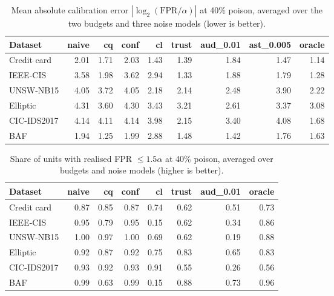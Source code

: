 \begin{table}[t]
\caption{Mean absolute calibration error $|\log_2(\mathrm{FPR}/\alpha)|$ at 40\% poison, averaged over the two budgets and three noise models (lower is better).}\label{tab:acal}
\centering\small
\begin{tabular}{lrrrrrrrr}
\toprule
Dataset & naive & cq & conf & cl & trust & aud\_0.01 & ast\_0.005 & oracle \\
\midrule
Credit card & 2.01 & 1.71 & 2.03 & 1.43 & 1.39 & 1.84 & 1.47 & 1.14 \\
IEEE-CIS & 3.58 & 1.98 & 3.62 & 2.94 & 1.33 & 1.88 & 1.79 & 1.28 \\
UNSW-NB15 & 4.05 & 3.72 & 4.05 & 2.18 & 2.14 & 2.48 & 3.90 & 2.22 \\
Elliptic & 4.31 & 3.60 & 4.30 & 3.43 & 3.21 & 2.61 & 3.37 & 3.08 \\
CIC-IDS2017 & 4.14 & 4.11 & 4.14 & 3.98 & 2.15 & 3.40 & 4.08 & 1.68 \\
BAF & 1.94 & 1.25 & 1.99 & 2.88 & 1.48 & 1.42 & 1.76 & 1.63 \\
\bottomrule
\end{tabular}
\end{table}

\begin{table}[t]
\caption{Share of units with realised FPR $\le1.5\alpha$ at 40\% poison, averaged over budgets and noise models (higher is better).}\label{tab:share}
\centering\small
\begin{tabular}{lrrrrrrr}
\toprule
Dataset & naive & cq & conf & cl & trust & aud\_0.01 & oracle \\
\midrule
Credit card & 0.87 & 0.85 & 0.87 & 0.74 & 0.62 & 0.51 & 0.73 \\
IEEE-CIS & 0.95 & 0.79 & 0.95 & 0.15 & 0.62 & 0.34 & 0.86 \\
UNSW-NB15 & 1.00 & 0.97 & 1.00 & 0.69 & 0.62 & 0.19 & 0.88 \\
Elliptic & 0.92 & 0.87 & 0.92 & 0.75 & 0.83 & 0.65 & 0.83 \\
CIC-IDS2017 & 0.93 & 0.92 & 0.93 & 0.91 & 0.55 & 0.26 & 0.56 \\
BAF & 0.99 & 0.63 & 0.99 & 0.15 & 0.88 & 0.73 & 0.96 \\
\bottomrule
\end{tabular}
\end{table}

